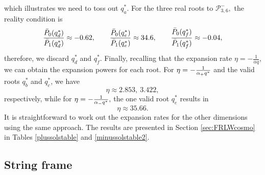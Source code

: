 \documentclass[amsmath,amssymb,11pt]{article}
\begin{document}
which illustrates we need to toss out $q_a^*$. For the three real roots to $\mathcal{P}^{-}_{3,6},$ the reality condition is
\begin{equation}
\frac{\bP_0(q_d^*)}{\bP_1(q_d^*)}\approx -0.62, \ \ \ \ \ \ \frac{\bP_0(q_e^*)}{\bP_1(q_e^*)}\approx 34.6, \ \ \ \ \ \ \frac{\bP_0(q_f^*)}{\bP_1(q_f^*)}\approx -0.04,
\end{equation}
therefore, we discard $q_d^*$ and $q_f^*$. Finally, recalling that the expansion rate $\eta=-\frac{1}{\alpha q}$, we can obtain the expansion powers for each root. For $\eta=-\frac{1}{\alpha_+  q^*}$ and the valid roots $q_b^*$ and $q_c^*$, we have
\begin{equation}
\eta \approx 2.853, \ 3.422,
\end{equation}
respectively, while for $\eta=-\frac{1}{\alpha_- q^*},$ the one valid root $q_e^*$ results in 
\begin{equation}
\eta \approx 35.66.
\end{equation}
It is straightforward to work out the expansion rates for the other dimensions using the same approach. The results are presented in Section \ref{sec:FRLWcosmo} in Tables \ref{plussolstable} and \ref{minussolstable2}.


\subsection{String frame}
\end{document}
